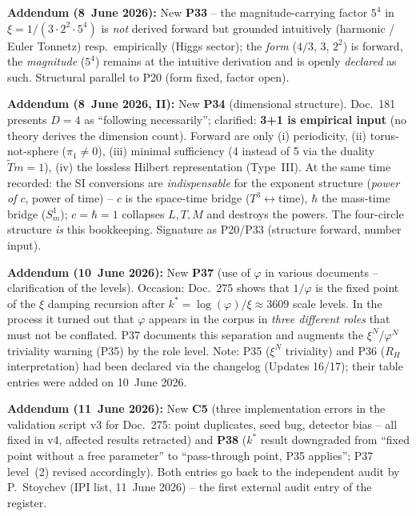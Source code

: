\medskip

\textbf{Addendum (8~June 2026):} New \textbf{P33} -- the magnitude-carrying
factor $5^4$ in $\xi = 1/(3\cdot2^2\cdot5^4)$ is \emph{not} derived forward but
grounded intuitively (harmonic / Euler Tonnetz) resp.\ empirically (Higgs
sector); the \emph{form} ($4/3$, $3$, $2^2$) is forward, the \emph{magnitude}
($5^4$) remains at the intuitive derivation and is openly \emph{declared} as
such. Structural parallel to P20 (form fixed, factor open).

\medskip

\textbf{Addendum (8~June 2026, II):} New \textbf{P34} (dimensional structure).
Doc.~181 presents $D=4$ as ``following necessarily''; clarified: \textbf{3+1
is empirical input} (no theory derives the dimension count). Forward are only
(i) periodicity, (ii) torus-not-sphere ($\pi_1\neq0$), (iii) minimal
sufficiency (4 instead of 5 via the duality $\tilde T m=1$), (iv) the lossless
Hilbert representation (Type~III). At the same time recorded: the SI
conversions are \emph{indispensable} for the exponent structure (\emph{power of
$c$}, power of time) -- $c$ is the space-time bridge ($T^3\leftrightarrow$time),
$\hbar$ the mass-time bridge ($S^1_m$); $c=\hbar=1$ collapses $L,T,M$ and
destroys the powers. The four-circle structure \emph{is} this bookkeeping.
Signature as P20/P33 (structure forward, number input).

\medskip

\textbf{Addendum (10~June 2026):} New \textbf{P37} (use of $\varphi$ in various
documents -- clarification of the levels). Occasion: Doc.~275 shows that
$1/\varphi$ is the fixed point of the $\xi$ damping recursion after
$k^* = \log(\varphi)/\xi \approx 3609$ scale levels. In the process it turned
out that $\varphi$ appears in the corpus in \emph{three different roles} that
must not be conflated. P37 documents this separation and augments the
$\xi^N$/$\varphi^N$ triviality warning (P35) by the role level. Note: P35
($\xi^N$ triviality) and P36 ($R_H$ interpretation) had been declared via the
changelog (Updates 16/17); their table entries were added on 10~June 2026.

\textbf{Addendum (11~June 2026):} New \textbf{C5} (three implementation errors
in the validation script v3 for Doc.~275: point duplicates, seed bug,
detector bias -- all fixed in v4, affected results retracted) and \textbf{P38}
($k^*$ result downgraded from ``fixed point without a free parameter'' to
``pass-through point, P35 applies''; P37 level~(2) revised accordingly). Both
entries go back to the independent audit by P.~Stoychev (IPI list, 11~June
2026) -- the first external audit entry of the register.

